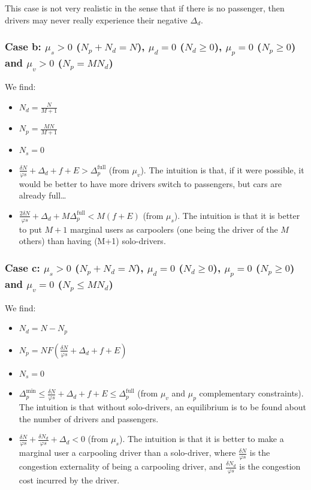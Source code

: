 \documentclass[english, a4paper]{article}
\theoremstyle{plain}
\theoremstyle{definition}
\theoremstyle{remark}
\begin{document}
    This case is not very realistic in the sense that if there is no passenger, then drivers may never really experience their negative $\Delta_d$.

    \subsubsection{Case b: $\mu_s > 0$ ($N_p + N_d = N$), $\mu_d = 0$ ($N_d \geq 0$), $\mu_p = 0$ ($N_p \geq 0$) and $\mu_v > 0$ ($N_p = MN_d$)}

    We find:

    \begin{itemize}
        \item $N_d = \frac{N}{M+1}$
        \item $N_p = \frac{MN}{M+1}$
        \item $N_s = 0$
        \item $\frac{\delta N}{\varphi s} + \Delta_d + f + E > \Delta_p^{\text{full}}$ (from $\mu_v$). The intuition is that, if it were possible, it would be better to have more drivers switch to passengers, but cars are already full…
        \item $\frac{2\delta N}{\varphi s} + \Delta_d + M\Delta_p^{\text{full}} < M(f + E)$ (from $\mu_s$). The intuition is that it is better to put $M+1$ marginal users as carpoolers (one being the driver of the $M$ others) than having (M+1) solo-drivers.
    \end{itemize}

    \subsubsection{Case c: $\mu_s > 0$ ($N_p + N_d = N$), $\mu_d = 0$ ($N_d \geq 0$), $\mu_p = 0$ ($N_p \geq 0$) and $\mu_v = 0$ ($N_p \leq MN_d$)}

    We find:

    \begin{itemize}
        \item $N_d = N - N_p$
        \item $N_p = NF\left( \frac{\delta N}{\varphi s} + \Delta_d + f + E \right)$
        \item $N_s = 0$
        \item $\Delta_p^{\text{min}}\leq \frac{\delta N}{\varphi s} + \Delta_d + f + E \leq \Delta_p^{\text{full}}$ (from $\mu_v$ and $\mu_p$ complementary constraints). The intuition is that without solo-drivers, an equilibrium is to be found about the number of drivers and passengers.
        \item $\frac{\delta N}{\varphi s} + \frac{\delta N_d}{\varphi s} + \Delta_d <0$ (from $\mu_s$). The intuition is that it is better to make a marginal user a carpooling driver than a solo-driver, where $\frac{\delta N}{\varphi s}$ is the congestion externality of being a carpooling driver, and $\frac{\delta N_d}{\varphi s}$ is the congestion cost incurred by the driver.
    \end{itemize}
\end{document}
